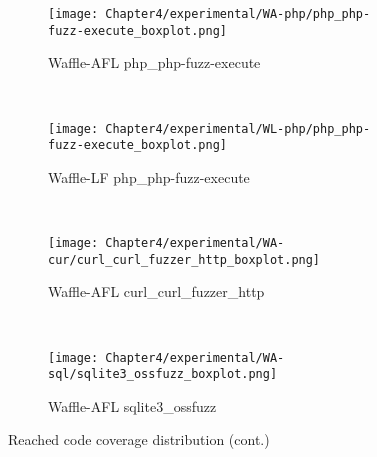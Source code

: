 \begin{figure}[!t]\ContinuedFloat
    \begin{adjustbox}{center,max width=1.3\textwidth}
        \begin{subfigure}[t]{0.5\textwidth}
            \centering
            \texttt{[image: Chapter4/experimental/WA-php/php\_php-fuzz-execute\_boxplot.png]}
            \vspace*{-5mm}
            \caption{Waffle-AFL php\_php-fuzz-execute}
            \label{box:wap}
            \vspace*{5mm}
        \end{subfigure}
        ~
        \begin{subfigure}[t]{0.5\textwidth}
            \centering
            \texttt{[image: Chapter4/experimental/WL-php/php\_php-fuzz-execute\_boxplot.png]}
            \vspace*{-5mm}
            \caption{Waffle-LF php\_php-fuzz-execute}
            \label{box:wlp}
            \vspace*{5mm}
        \end{subfigure}
    \end{adjustbox}
    ~
    \begin{adjustbox}{center,max width=1.3\textwidth}
        
        \begin{subfigure}[t]{0.5\textwidth}
            \centering
            \texttt{[image: Chapter4/experimental/WA-cur/curl\_curl\_fuzzer\_http\_boxplot.png]}
            \vspace*{-5mm}
            \caption{Waffle-AFL curl\_curl\_fuzzer\_http}
            \label{box:wac}
            \vspace*{5mm}
        \end{subfigure}
        ~
        \begin{subfigure}[t]{0.5\textwidth}
            \centering
            \texttt{[image: Chapter4/experimental/WA-sql/sqlite3\_ossfuzz\_boxplot.png]}
            \vspace*{-5mm}
            \caption{Waffle-AFL sqlite3\_ossfuzz}
            \label{box:was}
            \vspace*{5mm}
        \end{subfigure}
    \end{adjustbox}
    \caption{Reached code coverage distribution (cont.)}
\end{figure}

